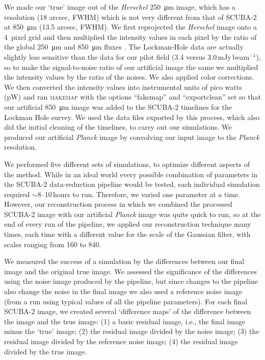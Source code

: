 \documentclass[a4paper,fleqn,usenatbib, twocolumn]{aastex63}
\begin{document}
We made our `true' image out of the {\it Herschel}  \SI{250}{\micro\meter} image, which has
a resolution (18 arcsec, FWHM) which is not very different from that of
SCUBA-2 at  \SI{850}{\micro\meter} (13.5 arcsec, FWHM). We first reprojected the {\it Herschel}
image onto a 4\arcsec\ pixel grid
and then multiplied the intensity values in each pixel by the
ratio of the global \SI{250}{\micro\meter} and  \SI{850}{\micro\meter} fluxes \citep{planck2015}. The Lockman-Hole
data are actually slightly less sensitive than the data for our pilot field
(3.4 versus 3.0\,mJy\,beam$^{-1}$), so to make the signal-to-noise ratio of our artificial
image the same we multiplied the intensity values by the ratio of the noises.
We also applied color corrections. We then converted the
intensity values into instrumental units of pico watts (pW) and ran
\textsc{makemap} with the options ``fakemap'' and ``exportclean'' set so that our artificial \SI{850}{\micro\meter} image was added to the SCUBA-2 timelines for the Lockman
Hole survey. We used the data files exported by this process, which also did
the initial cleaning of the timelines, to carry out our simulations.
We produced our artificial {\it Planck} image by convolving our
input image to the {\it Planck} resolution.

We performed five different sets of simulations, to optimize different aspects of the method. While in an ideal world every possible combination of parameters
in the SCUBA-2 data-reduction pipeline would be tested, each individual simulation required $\sim$8--10\,hours to run.
Therefore, we varied one parameter at a time. However, our reconstruction
process in which we combined the processed SCUBA-2 image with our
artificial {\it Planck} image was quite quick to run, so at the end of every
run of the pipeline, we applied our reconstruction technique many times, each
time with a different value for the scale of the Gaussian filter, with scales
ranging from 160 to 840\arcsec.

We measured the success of a simulation by the differences between
our final image and the original true image. We assessed the significance
of the differences using the noise image produced by the pipeline, but since changes
to the pipeline also change the noise in the final image we also used a reference
noise image (from a run using typical values of all the pipeline parameters).
For each final SCUBA-2 image, we created several `difference maps' of
the difference between the image and the true image: (1) a basic residual image, i.e., the final image minus the `true' image; (2) the residual image divided by the noise image; (3) the residual image divided by the reference noise image; (4) the residual
image divided by the true image. 
\end{document}
